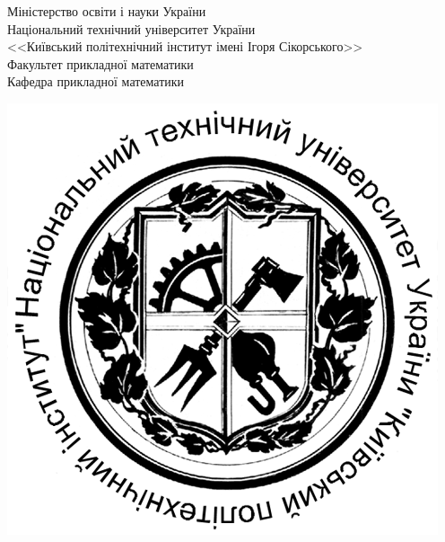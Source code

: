 \begin{titlepage}
    \newpage

    \begin{minipage}[c]{\linewidth}

        \newlength{\maxpreambula}

        \hspace{5cm}\parbox{\maxpreambula}{
            \begin{spacing}{1.1}\small{
                Міністерство освіти і науки України \\
                Національний технічний університет України \\
                <<Київський політехнічний інститут імені Ігоря Сікорського>> \\
                Факультет прикладної математики \\
                Кафедра прикладної математики}
            \end{spacing}
        }
            
        \vspace*{-2.55cm}
        \hspace*{1.4cm}
        \includegraphics[width=0.15\paperwidth]{kpi_emblem.png}

    \end{minipage}
    

\end{titlepage}
